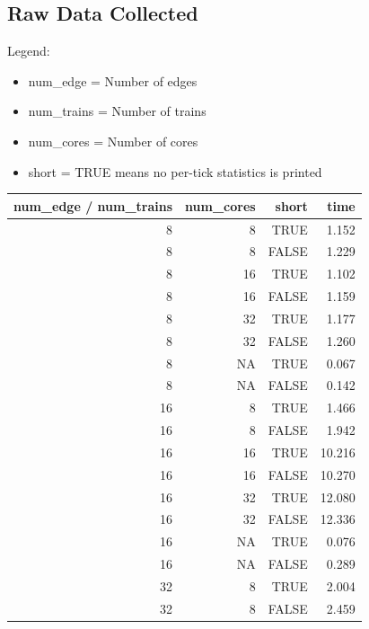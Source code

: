 \documentclass[a4paper,12pt]{article}
\begin{document}
\subsection{Raw Data Collected}
Legend:
\begin{itemize}
	\item num\_edge = Number of edges
	\item num\_trains = Number of trains
	\item num\_cores = Number of cores
	\item short = TRUE means no per-tick statistics is printed
\end{itemize}
\begin{center}
	\begin{tabular}{r r r | r}
		num\_edge / num\_trains & num\_cores & short & time    \\
		\hline
		8                       & 8          & TRUE  & 1.152   \\
		8                       & 8          & FALSE & 1.229   \\
		8                       & 16         & TRUE  & 1.102   \\
		8                       & 16         & FALSE & 1.159   \\
		8                       & 32         & TRUE  & 1.177   \\
		8                       & 32         & FALSE & 1.260   \\
		8                       & NA         & TRUE  & 0.067   \\
		8                       & NA         & FALSE & 0.142   \\
		\hline
		16                      & 8          & TRUE  & 1.466   \\
		16                      & 8          & FALSE & 1.942   \\
		16                      & 16         & TRUE  & 10.216  \\
		16                      & 16         & FALSE & 10.270  \\
		16                      & 32         & TRUE  & 12.080  \\
		16                      & 32         & FALSE & 12.336  \\
		16                      & NA         & TRUE  & 0.076   \\
		16                      & NA         & FALSE & 0.289   \\
		\hline
		32                      & 8          & TRUE  & 2.004   \\
		32                      & 8          & FALSE & 2.459   \\

\end{tabular}
\end{center}
\end{document}
